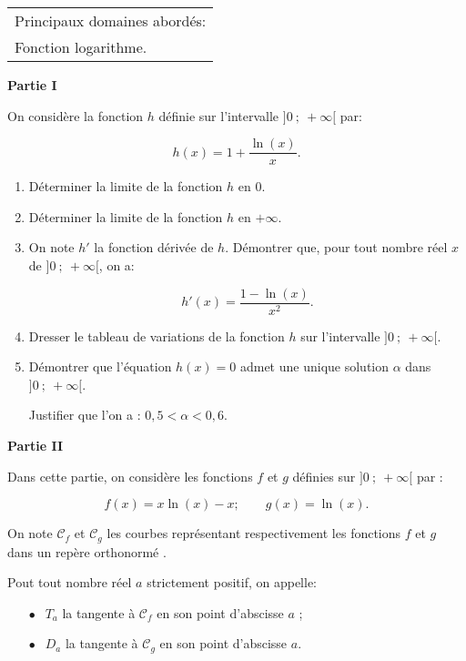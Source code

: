 
\medskip

\begin{tabular}{|l|}\hline
Principaux domaines abordés:\\
Fonction logarithme.\\ \hline
\end{tabular}

\bigskip

\textbf{Partie I}

\medskip

On considère la fonction $h$ définie sur l'intervalle $]0~;~ +\infty[$ par:

\[h(x) = 1 + \dfrac{\ln (x)}{x}.\]

\smallskip

\begin{enumerate}
\item Déterminer la limite de la fonction $h$ en $0$.
\item Déterminer la limite de la fonction $h$ en $+\infty$.
\item On note $h'$ la fonction dérivée de $h$. Démontrer que, pour tout nombre réel $x$ de $]0~;~ +\infty[$, on a:

\[h'(x) = \dfrac{1 - \ln (x)}{x^2}.\]

\smallskip

\item Dresser le tableau de variations de la fonction $h$ sur l'intervalle $]0~;~ +\infty[$.
\item Démontrer que l'équation $h(x) = 0$ admet une unique solution $\alpha$ dans $]0~;~ +\infty[$. 

Justifier que l'on a : $0,5 < \alpha < 0,6$.
\end{enumerate}

\bigskip

\textbf{Partie II}

\medskip

Dans cette partie, on considère les fonctions $f$ et $g$ définies sur $]0~;~ +\infty[$ par : 

\[f(x) = x \ln (x) - x ;\qquad  g(x) = \ln (x).\]

On note $\mathcal{C}_f$ et $\mathcal{C}_g$ les courbes représentant respectivement les fonctions $f$ et $g$ dans un repère orthonormé \Oij.

Pout tout nombre réel $a$ strictement positif, on appelle:

\setlength\parindent{1cm}
\begin{itemize}
\item[$\bullet~~$] $T_a$ la tangente à $\mathcal{C}_f$ en son point d'abscisse $a$ ;
\item[$\bullet~~$] $D_a$ la tangente à $\mathcal{C}_g$ en son point d'abscisse $a$.
\end{itemize}
\setlength\parindent{0cm}

